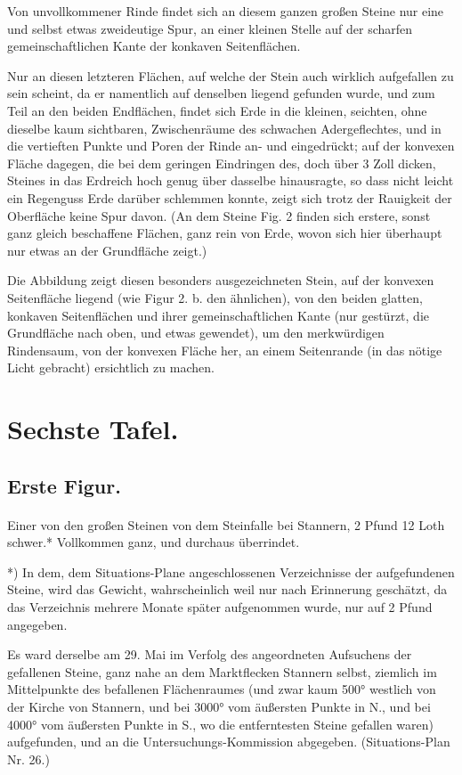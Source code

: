 \documentclass[a4paper, 11pt, oneside, german]{article}
\begin{document}
Von unvollkommener Rinde findet sich an diesem ganzen großen Steine nur eine und selbst etwas zweideutige Spur, an einer kleinen Stelle auf der scharfen gemeinschaftlichen Kante der konkaven Seitenflächen.

Nur an diesen letzteren Flächen, auf welche der Stein auch wirklich aufgefallen zu sein scheint, da er namentlich auf denselben liegend gefunden wurde, und zum Teil an den beiden Endflächen, findet sich Erde in die kleinen, seichten, ohne dieselbe kaum sichtbaren, Zwischenräume des schwachen Adergeflechtes, und in die vertieften Punkte und Poren der Rinde an- und eingedrückt; auf der konvexen Fläche dagegen, die bei dem geringen Eindringen des, doch über 3 Zoll dicken, Steines in das Erdreich hoch genug über dasselbe hinausragte, so dass nicht leicht ein Regenguss Erde darüber schlemmen konnte, zeigt sich trotz der Rauigkeit der Oberfläche keine Spur davon. (An dem Steine Fig. 2 finden sich erstere, sonst ganz gleich beschaffene Flächen, ganz rein von Erde, wovon sich hier überhaupt nur etwas an der Grundfläche zeigt.)

Die Abbildung zeigt diesen besonders ausgezeichneten Stein, auf der konvexen Seitenfläche liegend (wie Figur 2. b. den ähnlichen), von den beiden glatten, konkaven Seitenflächen und ihrer gemeinschaftlichen Kante (nur gestürzt, die Grundfläche nach oben, und etwas gewendet), um den merkwürdigen Rindensaum, von der konvexen Fläche her, an einem Seitenrande (in das nötige Licht gebracht) ersichtlich zu machen.
\clearpage
\section{Sechste Tafel.}
\subsection{Erste Figur.}
\paragraph{}
Einer von den großen Steinen von dem Steinfalle bei Stannern, 2 Pfund 12 Loth schwer.* Vollkommen ganz, und durchaus überrindet.

*) In dem, dem Situations-Plane angeschlossenen Verzeichnisse der aufgefundenen Steine, wird das Gewicht, wahrscheinlich weil nur nach Erinnerung geschätzt, da das Verzeichnis mehrere Monate später aufgenommen wurde, nur auf 2 Pfund angegeben.

Es ward derselbe am 29. Mai im Verfolg des angeordneten Aufsuchens der gefallenen Steine, ganz nahe an dem Marktflecken Stannern selbst, ziemlich im Mittelpunkte des befallenen Flächenraumes (und zwar kaum 500° westlich von der Kirche von Stannern, und bei 3000° vom äußersten Punkte in N., und bei 4000° vom äußersten Punkte in S., wo die entferntesten Steine gefallen waren) aufgefunden, und an die Untersuchungs-Kommission abgegeben. (Situations-Plan Nr. 26.)
\end{document}
